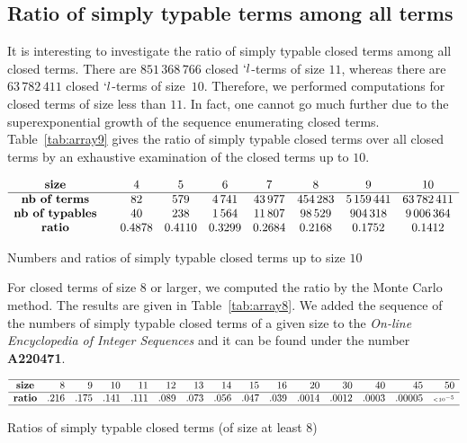 \documentclass{jfp1}
\begin{document}
    \subsection{Ratio of simply typable terms among all terms}
    \label{sec:ratio-simply-typed}
    It is interesting to investigate the ratio of simply typable closed terms among
    all closed terms.
    There are $851\,368\,766$ closed $`l$-terms of size $11$, whereas
    there are $63\,782\,411$ closed $`l$-terms of size~$10$. Therefore, we performed
    computations for closed terms of size less than $11$. In fact, one cannot go much
    further due to the superexponential growth of the sequence enumerating closed
    terms.
Table~\ref{tab:array9} gives the ratio of simply typable closed terms over all closed terms by an
    exhaustive examination of the closed terms up to $10$.
 \begin{table*}[htb!]
   \centering
    \begin{displaymath}
      \begin{array}{  c @{\qquad}   c   c   c   c c c c }
\textbf{size} & 4 & 5 & 6 & 7 & 8 & 9 &10\\
          \hline \textbf{nb of terms} & 82 & 579 & 4\,741 & 43\,977 & 454\,283 & 5\,159\,441
          & 63\,782\,411\\
\textbf{nb of typables} & 40& 238 & 1\,564 & 11\,807 & 98\,529 &
          904\,318& 9\,006\,364\\
\textbf{ratio} & 0.4878 & 0.4110 & 0.3299  & 0.2684 & 0.2168& 0.1752& 0.1412\\
\end{array}
      \end{displaymath}
   \caption{Numbers and ratios of simply typable closed terms up to size $10$}
   \label{tab:array9}
 \end{table*}
 For closed terms of size $8$ or larger, we computed the ratio by the Monte Carlo
 method. The results are given in Table~\ref{tab:array8}. We added the sequence of the numbers
 of simply typable closed terms of a given size to the \emph{On-line
   Encyclopedia of Integer Sequences} and it can be found under the number \textbf{A220471}.
 \begin{table*}[htb!]
   \centering
     \begin{scriptsize}
       \begin{math}
         \begin{array}{  c  @{\quad} r   r   r   r   r   r   r   r   r   r   r   r   r   r  r }
           \hline
           \textbf{size} & 8 & 9 & 10 & 11 & 12 & 13 & 14 & 15 & 16 & 20 & 30 & 40 & 45 & 50 \\
           \hline
           \textbf{ratio} & .216 &.175 & .141 & .111 & .089 & .073  & .056 & .047 & .039 &
           .0014 & .0012& . 0003
           & .00005 & {\scriptscriptstyle < 10^{-5}} \\
           \hline
         \end{array}
       \end{math}
     \end{scriptsize}
   \caption{Ratios of simply typable closed terms (of size at least $8$)}
   \label{tab:array8}
 \end{table*}
\end{document}
